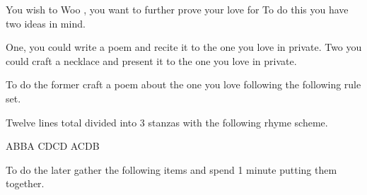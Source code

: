 \documentclass[green]{guildcamp4}
\begin{document}
\name{\gWoo{}}

You wish to Woo \cJulie{}, you want to further prove your love for  To do this you have two ideas in mind.

One, you could write a poem and recite it to the one you love in private.
Two you could craft a necklace and present it to the one you love in private.

To do the former craft a poem about the one you love following the following rule set.

Twelve lines total divided into 3 stanzas with the following rhyme scheme.

ABBA CDCD ACDB

To do the later gather the following items and spend 1 minute putting them together. 
\end{document}
